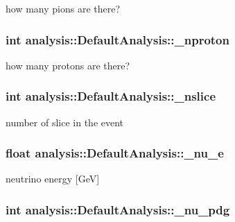 how many pions are there? \hypertarget{classanalysis_1_1DefaultAnalysis_a10ce44826114a375e883d727ed0ad876}{
\subsubsection[{\-\_\-nproton}]{\setlength{\rightskip}{0pt plus 5cm}int analysis\-::\-Default\-Analysis\-::\-\_\-nproton\hspace{0.3cm}{\ttfamily [private]}}}\label{classanalysis_1_1DefaultAnalysis_a10ce44826114a375e883d727ed0ad876}
how many protons are there? \hypertarget{classanalysis_1_1DefaultAnalysis_a3eddf49910782afed7f324755fffe681}{
\subsubsection[{\-\_\-nslice}]{\setlength{\rightskip}{0pt plus 5cm}int analysis\-::\-Default\-Analysis\-::\-\_\-nslice\hspace{0.3cm}{\ttfamily [private]}}}\label{classanalysis_1_1DefaultAnalysis_a3eddf49910782afed7f324755fffe681}
number of slice in the event \hypertarget{classanalysis_1_1DefaultAnalysis_a41a1c23e4cb1a09e08024c7fa33572ce}{
\subsubsection[{\-\_\-nu\-\_\-e}]{\setlength{\rightskip}{0pt plus 5cm}float analysis\-::\-Default\-Analysis\-::\-\_\-nu\-\_\-e\hspace{0.3cm}{\ttfamily [private]}}}\label{classanalysis_1_1DefaultAnalysis_a41a1c23e4cb1a09e08024c7fa33572ce}
neutrino energy \mbox{[}Ge\-V\mbox{]} \hypertarget{classanalysis_1_1DefaultAnalysis_a625c353bb8912893b77a14f44d4f00b0}{
\subsubsection[{\-\_\-nu\-\_\-pdg}]{\setlength{\rightskip}{0pt plus 5cm}int analysis\-::\-Default\-Analysis\-::\-\_\-nu\-\_\-pdg\hspace{0.3cm}{\ttfamily [private]}}}\label{classanalysis_1_1DefaultAnalysis_a625c353bb8912893b77a14f44d4f00b0}
